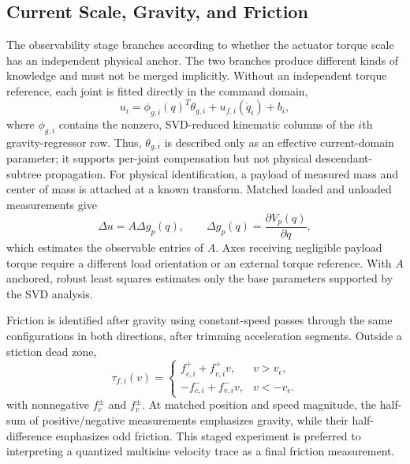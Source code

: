 \documentclass[conference]{IEEEtran}
\begin{document}
\subsection{Current Scale, Gravity, and Friction}
The observability stage branches according to whether the actuator torque scale
has an independent physical anchor. The two branches produce different kinds
of knowledge and must not be merged implicitly.
Without an independent torque reference, each joint is fitted directly in the
command domain,
\begin{equation}
 u_i=\phi_{g,i}(q)^T\theta_{g,i}+u_{f,i}(\dot q_i)+b_i,
 \label{eq:current_domain}
\end{equation}
where $\phi_{g,i}$ contains the nonzero, SVD-reduced kinematic columns of the
$i$th gravity-regressor row. Thus, $\theta_{g,i}$ is described only as an
effective current-domain parameter; it supports per-joint compensation but not
physical descendant-subtree propagation. For physical identification, a
payload of measured mass and center of mass is attached at a known transform. Matched
loaded and unloaded measurements give \cite{Gautier2012DriveGains}
\begin{equation}
 \Delta u=A\Delta g_p(q),\qquad
 \Delta g_p(q)=\frac{\partial V_p(q)}{\partial q},
 \label{eq:payload_scale}
\end{equation}
which estimates the observable entries of $A$. Axes receiving negligible
payload torque require a different load orientation or an external torque
reference. With $A$ anchored, robust least squares estimates only the base
parameters supported by the SVD analysis.

Friction is identified after gravity using constant-speed passes through the
same configurations in both directions, after trimming acceleration segments.
Outside a stiction dead zone,
\begin{equation}
 \tau_{f,i}(v)=
 \begin{cases}
 f_{c,i}^{+}+f_{v,i}^{+}v,&v>v_\epsilon,\\
 -f_{c,i}^{-}+f_{v,i}^{-}v,&v<-v_\epsilon.
 \end{cases}
 \label{eq:friction}
\end{equation}
with nonnegative $f_c^{\pm}$ and $f_v^{\pm}$.
At matched position and speed magnitude, the half-sum of positive/negative
measurements emphasizes gravity, while their half-difference emphasizes odd
friction. This staged experiment is preferred to interpreting a quantized
multisine velocity trace as a final friction measurement.
\end{document}
